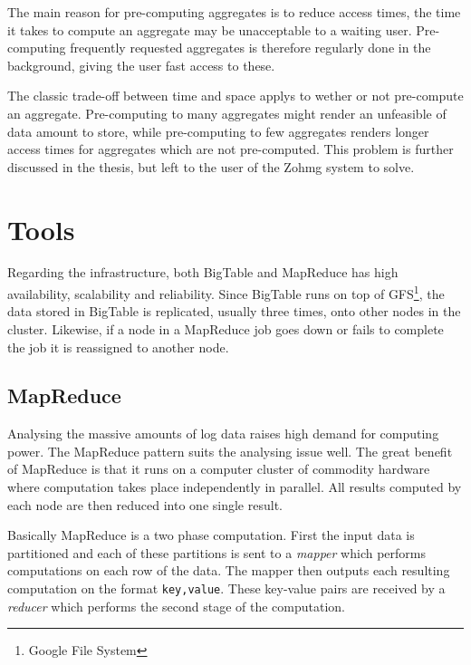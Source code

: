 \documentclass[a4paper,10pt]{book}
\begin{document}
The main reason for pre-computing aggregates is to reduce access times, the
time it takes to compute an aggregate may be unacceptable to a waiting
user. Pre-computing frequently requested aggregates is therefore regularly
done in the background, giving the user fast access to these.
\cite{olap_solutions}

The classic trade-off between time and space applys to wether or not
pre-compute an aggregate. Pre-computing to many aggregates might render an
unfeasible of data amount to store, while pre-computing to few aggregates
renders longer access times for aggregates which are not pre-computed. This
problem is further discussed in the thesis, but left to the user of the
Zohmg system to solve.



\chapter{Tools}

Regarding the infrastructure, both BigTable and MapReduce has high
availability, scalability and reliability. Since BigTable runs on top of
GFS\footnote{Google File System}, the data stored in BigTable is
replicated, usually three times, onto other nodes in the cluster.
\cite{gfs} Likewise, if a node in a MapReduce job goes down or fails to
complete the job it is reassigned to another node. \cite{mapreduce}



\section{MapReduce}

Analysing the massive amounts of log data raises high demand for computing
power. The MapReduce \cite{mapreduce} pattern suits the analysing issue
well. The great benefit of MapReduce is that it runs on a computer cluster
of commodity hardware where computation takes place independently in
parallel. All results computed by each node are then reduced into one
single result.

Basically MapReduce is a two phase computation. First the input data is
partitioned and each of these partitions is sent to a \textit{mapper} which
performs computations on each row of the data. The mapper then outputs each
resulting computation on the format \texttt{key,value}. These key-value
pairs are received by a \textit{reducer} which performs the second stage of
the computation.
\end{document}
